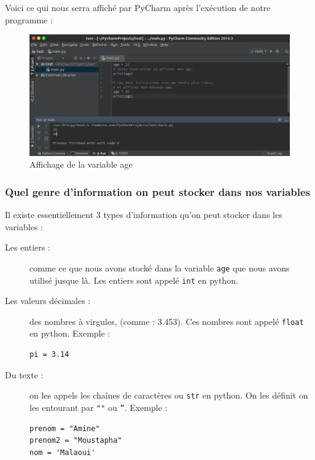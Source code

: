 \documentclass[12pt]{article}
\newcommand{\code}[1]{\colorbox{light-gray}{\texttt{#1}}}
\begin{document}
            Voici ce qui nous serra affiché par PyCharm après l'exécution de notre programme :

            \begin{figure}[H]
                \centering
                \includegraphics[width=\linewidth]{img/15_affiche_variables.png}
                \caption{Affichage de la variable age}
            \end{figure}

        \subsubsection{Quel genre d'information on peut stocker dans nos variables}
            Il existe essentiellement 3 types d'information qu'on peut stocker dans les variables :
            \begin{description}
                \item[Les entiers :] comme ce que nous avons stocké dans la variable \code{age} que nous avons
                    utilisé jusque là. Les entiers sont appelé \code{int} en python.
                \item[Les valeurs décimales :] des nombres à virgules, (comme : 3.453). Ces nombres sont appelé
                    \code{float} en python. Exemple :
                    \begin{lstlisting}[style=code]
pi = 3.14
                    \end{lstlisting}
                \item[Du texte :] on les appels les chaînes de caractères ou \code{str} en python. On les définit on les
                    entourant par \code{""} ou \code{''}. Exemple :
                    \begin{lstlisting}[style=code]
prenom = "Amine"
prenom2 = "Moustapha"
nom = 'Malaoui'
                    \end{lstlisting}
            \end{description}
\end{document}
